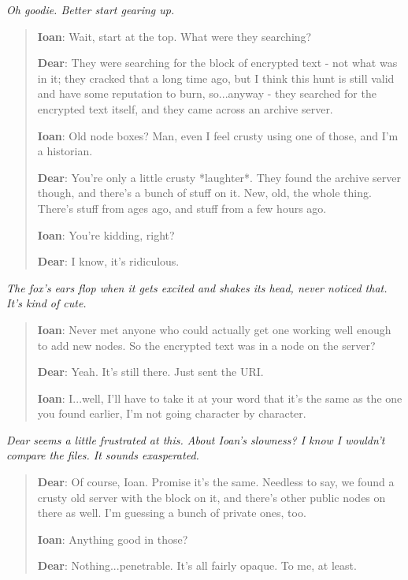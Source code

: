 \emph{Oh goodie. Better start gearing up.}

\begin{quote}
\textbf{Ioan}: Wait, start at the top. What were they searching?

\textbf{Dear}: They were searching for the block of encrypted text - not what was in it; they cracked that a long time ago, but I think this hunt is still valid and have some reputation to burn, so...anyway - they searched for the encrypted text itself, and they came across an archive server.

\textbf{Ioan}: Old node boxes? Man, even I feel crusty using one of those, and I'm a historian.

\textbf{Dear}: You're only a little crusty *laughter*. They found the archive server though, and there's a bunch of stuff on it. New, old, the whole thing. There's stuff from ages ago, and stuff from a few hours ago.

\textbf{Ioan}: You're kidding, right?

\textbf{Dear}: I know, it's ridiculous.
\end{quote}

\emph{The fox's ears flop when it gets excited and shakes its head, never noticed that. It's kind of cute.}

\begin{quote}
\textbf{Ioan}: Never met anyone who could actually get one working well enough to add new nodes. So the encrypted text was in a node on the server?

\textbf{Dear}: Yeah. It's still there. Just sent the URI.

\textbf{Ioan}: I...well, I'll have to take it at your word that it's the same as the one you found earlier, I'm not going character by character.
\end{quote}

\emph{Dear seems a little frustrated at this. About Ioan's slowness? I know I wouldn't compare the files. It sounds exasperated.}

\begin{quote}
\textbf{Dear}: Of course, Ioan. Promise it's the same. Needless to say, we found a crusty old server with the block on it, and there's other public nodes on there as well. I'm guessing a bunch of private ones, too.

\textbf{Ioan}: Anything good in those?

\textbf{Dear}: Nothing...penetrable. It's all fairly opaque. To me, at least.
\end{quote}

